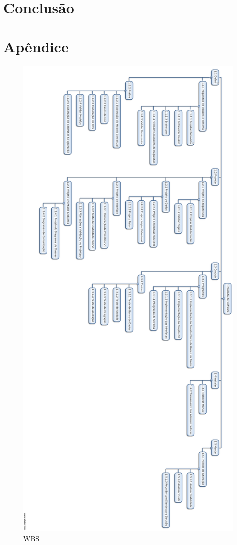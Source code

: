 \documentclass[a4paper,11pt]{article}
\begin{document}
\section{Conclusão}

\section{Apêndice}\label{apendice}
		\begin{figure}[!H]
    		\centering
        	\includegraphics[width=\textwidth,height=\dimexpr\textheight-3\baselineskip\relax,keepaspectratio]{WBS.png}
        	\caption{WBS}
     		\label{WBS}
    	\end{figure}
\end{document}
